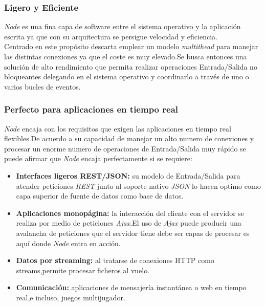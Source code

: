 \subsubsection*{Ligero y Eficiente}
\textit{Node} es una fina capa de software entre el sistema operativo y la aplicación escrita ya que con su arquitectura se persigue velocidad y eficiencia.
\\Centrado en este propósito descarta emplear un modelo \textit{multithead} para manejar las distintas conexiones ya que el coste es muy elevado.Se busca entonces una solución de alto rendimiento que permita realizar operaciones Entrada/Salida no bloqueantes delegando en el sistema operativo y coordinarlo a través de uno o varios bucles de eventos.
\subsubsection*{Perfecto para aplicaciones en tiempo real}
\textit{Node} encaja con los requisitos que exigen las aplicaciones en tiempo real flexibles.De acuerdo a su capacidad de manejar un alto numero de conexiones y procesar un enorme numero de operaciones de Entrada/Salida muy rápido se puede afirmar que \textit{Node} encaja perfectamente si se requiere:
\begin{itemize}
\item \textbf{Interfaces ligeros REST/JSON:} su modelo de Entrada/Salida para atender peticiones \textit{REST} junto al soporte nativo \textit{JSON} lo hacen optimo como capa superior de fuente de datos como base de datos.
\item \textbf{Aplicaciones monopágina:} la interacción del cliente con el servidor se realiza por medio de peticiones \textit{Ajax}.El uso de \textit{Ajax} puede producir una avalancha de peticiones que el servidor tiene debe ser capas de procesar es aquí donde \textit{Node} entra en acción.
\item \textbf{Datos por streaming:} al tratarse de conexiones HTTP como streams,permite procesar ficheros al vuelo.
\item \textbf{Comunicación:} aplicaciones de mensajería instantánea o web en tiempo real,e incluso, juegos multijugador.
\end{itemize}
